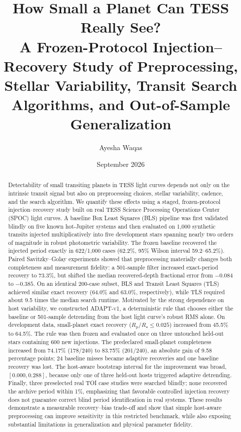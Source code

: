 \documentclass[11pt]{article}
\title{\textbf{How Small a Planet Can TESS Really See?}\\
\large A Frozen-Protocol Injection--Recovery Study of Preprocessing, Stellar Variability, Transit Search Algorithms, and Out-of-Sample Generalization}
\author{Ayesha Waqas}
\date{September 2026}
\newcommand{\rprs}{$R_{\mathrm p}/R_\star$}
\newcommand{\adapt}{\textsc{ADAPT-v1}}
\begin{document}
\maketitle

\begin{abstract}
Detectability of small transiting planets in TESS light curves depends not only on the intrinsic transit signal but also on preprocessing choices, stellar variability, cadence, and the search algorithm. We quantify these effects using a staged, frozen-protocol injection--recovery study built on real TESS Science Processing Operations Center (SPOC) light curves. A baseline Box Least Squares (BLS) pipeline was first validated blindly on five known hot-Jupiter systems and then evaluated on 1,000 synthetic transits injected multiplicatively into five development stars spanning nearly two orders of magnitude in robust photometric variability. The frozen baseline recovered the injected period exactly in 622/1,000 cases (62.2\%, 95\% Wilson interval 59.2--65.2\%). Paired Savitzky--Golay experiments showed that preprocessing materially changes both completeness and measurement fidelity: a 501-sample filter increased exact-period recovery to 73.3\%, but shifted the median recovered-depth fractional error from $-0.084$ to $-0.385$. On an identical 200-case subset, BLS and Transit Least Squares (TLS) achieved similar exact recovery (64.0\% and 63.0\%, respectively), while TLS required about 9.5 times the median search runtime. Motivated by the strong dependence on host variability, we constructed \adapt, a deterministic rule that chooses either the baseline or 501-sample detrending from the host light curve's robust RMS alone. On development data, small-planet exact recovery (\rprs$\leq0.025$) increased from 45.5\% to 64.5\%. The rule was then frozen and evaluated once on three untouched held-out stars containing 600 new injections. The predeclared small-planet completeness increased from 74.17\% (178/240) to 83.75\% (201/240), an absolute gain of 9.58 percentage points; 24 baseline misses became adaptive recoveries and one baseline recovery was lost. The host-aware bootstrap interval for the improvement was broad, $[0.000,0.288]$, because only one of three held-out hosts triggered adaptive detrending. Finally, three preselected real TOI case studies were searched blindly; none recovered the archive period within 1\%, emphasizing that favorable controlled injection recovery does not guarantee correct blind period identification in real systems. These results demonstrate a measurable recovery--bias trade-off and show that simple host-aware preprocessing can improve sensitivity in this restricted benchmark, while also exposing substantial limitations in generalization and physical parameter fidelity.
\end{abstract}
\end{document}

